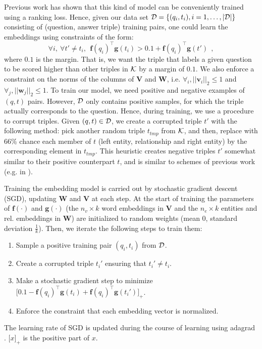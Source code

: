 \documentclass[runningheads,a4paper]{llncs}
\newcommand{\bbw}{\boldsymbol{w}}
\newcommand{\bbW}{\boldsymbol{W}}
\newcommand{\bbv}{\boldsymbol{v}}
\newcommand{\bbV}{\boldsymbol{V}}
\newcommand{\bbg}{\boldsymbol{g}}
\newcommand{\bbf}{\boldsymbol{f}}
\newcommand{\card}[1]{|#1|}
\begin{document}
Previous work \cite{wsabie,weston-EtAl:2013:EMNLP} has shown that this kind of model can be 
conveniently trained using a ranking loss.
Hence, given our data set ${\cal D}= \{(q_i, t_i), i=1,\dots,\card{{\cal D}}\}$ consisting of (question, answer triple) training pairs, one could  learn the embeddings using constraints of the form:
\begin{equation*}\label{eq:cons1}
    \forall i,~ \forall t' \neq t_i, ~~ \bbf(q_i)^\top \bbg(t_i)  >    0.1 +  \bbf(q_i)^\top \bbg(t')~~,
\end{equation*}
where $0.1$ is the margin.
That is, we want the triple that labels a given question to be scored higher than other triples in ${\cal K}$ by a margin of $0.1$.
We also enforce a constraint on the norms of the columns of $\bbV$ and $\bbW$, i.e.
 $\forall_i, ||\bbv_i||_2 \leq 1$ and $\forall_j, ||\bbw_j||_2 \leq 1$. 
To train our model, we need positive and negative examples of $(q,t)$ pairs. However, ${\cal D}$ only contains positive samples, for which the triple actually corresponds to the question.
Hence, during training, we use a procedure to corrupt triples. Given $(q,t)\in{\cal D}$, we create a corrupted triple $t'$ with the following method: pick another random triple $t_{tmp}$ from ${\cal K}$, and then, replace with 66\% chance each member of $t$ (left entity, relationship and right entity) by the corresponding element in $t_{tmp}$.
This heuristic creates negative triples $t'$ somewhat similar to their positive counterpart $t$, and is similar to schemes of previous work (e.g. in \cite{collobert:2011b,bordes:12aistats}).

Training the embedding model is carried out by stochastic gradient descent (SGD), updating $\bbW$ and $\bbV$ at each step. At the start of training the parameters of $\bbf(\cdot)$ and $\bbg(\cdot)$
(the $n_v\times k$ word embeddings in $\bbV$ and the $n_e \times k$ entities and rel. embeddings in $\bbW$) are initialized to random weights (mean 0, standard deviation $\frac{1}{k}$).
Then, we iterate the following steps to train them:
\begin{enumerate}
\item Sample a positive training pair $(q_i, t_i)$ from ${\cal D}$.
\item Create a corrupted triple $t_i'$ ensuring that $t_i'\neq t_i$.
\item Make a stochastic gradient step to minimize $ \big[0.1 - \bbf(q_i)^\top \bbg(t_i) + \bbf(q_i)^\top \bbg(t_i')\big]_+$.
\item Enforce the constraint that each embedding vector is normalized.
\end{enumerate}
The learning rate of SGD is updated during the course of learning using {\sc adagrad} \cite{duchi2011adaptive}. $\big[x\big]_+$ is the positive part of $x$.
\end{document}
